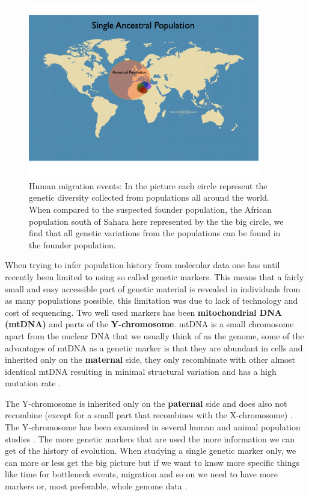 \documentclass[a4paper,11pt]{kth-mag}
\begin{document}
\begin{figure}[ht]
	\centering
		\includegraphics[width=0.9\textwidth]{../pictures/Single_origin_2.jpg}
	\caption{Human migration events: In the picture each circle represent the genetic diversity collected from populations all around the world. When compared to the suspected founder population, the African population south of Sahara here  represented by the the big circle, we find that all genetic variations from the populations can be found in the founder population.}
	\label{fig:single_origin}
\end{figure}

\vspace{3 mm}



When trying to infer population history from molecular data one has until recently been limited to using so called genetic markers. This means that a fairly small and easy accessible part of genetic material is revealed in individuals from as many populations possible, this limitation was due to lack of technology and cost of sequencing. Two well used markers has been \textbf{mitochondrial DNA (mtDNA)} and parts of the \textbf{Y-chromosome}. mtDNA is a small chromosome apart from the nuclear DNA that we usually think of as the genome, some of the advantages of mtDNA as a genetic marker is that they are abundant in cells and inherited only on the \textbf{maternal} side, they only recombinate with other almost identical mtDNA resulting in minimal structural variation and has a high mutation rate \cite{cann87}.
 
The Y-chromosome is inherited only on the \textbf{paternal} side and does also not recombine (except for a small part that recombines with the X-chromosome) \cite{underhill07}. The Y-chromosome has been examined in several human \cite{jobling03,kayser01} and animal population studies \cite{ginja08,ling10}. The more genetic markers that are used the more information we can get of the history of evolution. When studying a single genetic marker only, we can more or less get the big picture but if we want to know more specific things like time for bottleneck events, migration and so on we need to have more markers or, most preferable, whole genome data \cite{stoneking11}.
\end{document}
